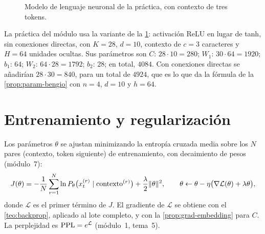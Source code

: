 \begin{figure}[h]
\centering
{}
\caption{Modelo de lenguaje neuronal de la práctica, con contexto de tres tokens.}\label{fig:bengio}
\end{figure}

\begin{ejemplo}\label{ej:practica}
La práctica del módulo usa la variante de la \cref{fig:bengio}: activación ReLU en lugar de tanh, sin conexiones directas, con $K=28$, $d=10$, contexto de $c=3$ caracteres y $H=64$ unidades ocultas. Sus parámetros son $C$: $28\cdot 10=280$; $W_1$: $30\cdot 64=1920$; $b_1$: $64$; $W_2$: $64\cdot 28=1792$; $b_2$: $28$; en total, $4084$. Con conexiones directas se añadirían $28\cdot 30=840$, para un total de $4924$, que es lo que da la fórmula de la \cref{prop:param-bengio} con $n=4$, $d=10$ y $h=64$.
\end{ejemplo}

\section{Entrenamiento y regularización}

Los parámetros $\theta$ se ajustan minimizando la entropía cruzada media sobre los $N$ pares (contexto, token siguiente) de entrenamiento, con decaimiento de pesos (módulo~7):
\[
J(\theta)=-\frac1N\sum_{r=1}^{N}\ln P_\theta\bigl(x^{(r)}_t\mid\text{contexto}^{(r)}\bigr)+\frac{\lambda}{2}\lVert\theta\rVert^{2},
\qquad \theta\leftarrow\theta-\eta\bigl(\nabla\mathcal{L}(\theta)+\lambda\theta\bigr),
\]
donde $\mathcal{L}$ es el primer término de $J$. El gradiente de $\mathcal{L}$ se obtiene con el \cref{teo:backprop}, aplicado al lote completo, y con la \cref{prop:grad-embedding} para $C$. La perplejidad es $\operatorname{PPL}=e^{\mathcal{L}}$ (módulo~1, tema~5).

